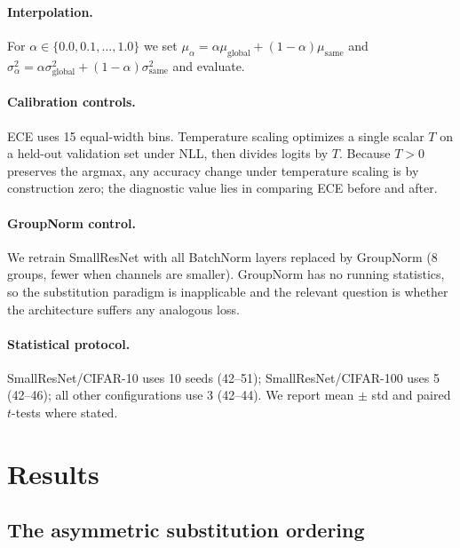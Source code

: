 \documentclass{article}
\begin{document}
\paragraph{Interpolation.} For $\alpha \in \{0.0,0.1,\dots,1.0\}$ we set $\mu_\alpha = \alpha \mu_{\text{global}} + (1-\alpha)\mu_{\text{same}}$ and $\sigma_\alpha^2 = \alpha\sigma^2_{\text{global}} + (1-\alpha)\sigma^2_{\text{same}}$ and evaluate.

\paragraph{Calibration controls.} ECE uses 15 equal-width bins. Temperature scaling \citep{guo2017calibration} optimizes a single scalar $T$ on a held-out validation set under NLL, then divides logits by $T$. Because $T>0$ preserves the argmax, any accuracy change under temperature scaling is by construction zero; the diagnostic value lies in comparing ECE before and after.

\paragraph{GroupNorm control.} We retrain SmallResNet with all BatchNorm layers replaced by GroupNorm (8 groups, fewer when channels are smaller). GroupNorm has no running statistics, so the substitution paradigm is inapplicable and the relevant question is whether the architecture suffers any analogous loss.

\paragraph{Statistical protocol.} SmallResNet/CIFAR-10 uses 10 seeds (42--51); SmallResNet/CIFAR-100 uses 5 (42--46); all other configurations use 3 (42--44). We report mean $\pm$ std and paired $t$-tests where stated.

\section{Results}
\label{sec:results}

\subsection{The asymmetric substitution ordering}
\label{sec:ordering}
\end{document}

